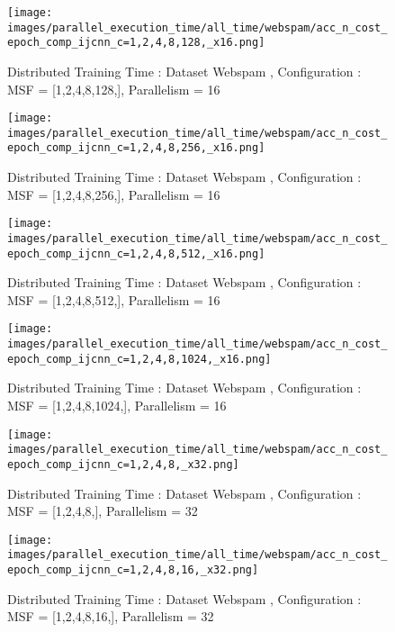\begin{figure*}[htbp]
\centering
\texttt{[image: images/parallel\_execution\_time/all\_time/webspam/acc\_n\_cost\_epoch\_comp\_ijcnn\_c=1,2,4,8,128,\_x16.png]}
\caption{Distributed Training Time : Dataset Webspam , Configuration : MSF = [1,2,4,8,128,], Parallelism = 16}
\label{fig:dis-msf-tr-time-webspam-x16}
\end{figure*}


\begin{figure*}[htbp]
\centering
\texttt{[image: images/parallel\_execution\_time/all\_time/webspam/acc\_n\_cost\_epoch\_comp\_ijcnn\_c=1,2,4,8,256,\_x16.png]}
\caption{Distributed Training Time : Dataset Webspam , Configuration : MSF = [1,2,4,8,256,], Parallelism = 16}
\label{fig:dis-msf-tr-time-webspam-x16}
\end{figure*}


\begin{figure*}[htbp]
\centering
\texttt{[image: images/parallel\_execution\_time/all\_time/webspam/acc\_n\_cost\_epoch\_comp\_ijcnn\_c=1,2,4,8,512,\_x16.png]}
\caption{Distributed Training Time : Dataset Webspam , Configuration : MSF = [1,2,4,8,512,], Parallelism = 16}
\label{fig:dis-msf-tr-time-webspam-x16}
\end{figure*}


\begin{figure*}[htbp]
\centering
\texttt{[image: images/parallel\_execution\_time/all\_time/webspam/acc\_n\_cost\_epoch\_comp\_ijcnn\_c=1,2,4,8,1024,\_x16.png]}
\caption{Distributed Training Time : Dataset Webspam , Configuration : MSF = [1,2,4,8,1024,], Parallelism = 16}
\label{fig:dis-msf-tr-time-webspam-x16}
\end{figure*}


\begin{figure*}[htbp]
\centering
\texttt{[image: images/parallel\_execution\_time/all\_time/webspam/acc\_n\_cost\_epoch\_comp\_ijcnn\_c=1,2,4,8,\_x32.png]}
\caption{Distributed Training Time : Dataset Webspam , Configuration : MSF = [1,2,4,8,], Parallelism = 32}
\label{fig:dis-msf-tr-time-webspam-x32}
\end{figure*}


\begin{figure*}[htbp]
\centering
\texttt{[image: images/parallel\_execution\_time/all\_time/webspam/acc\_n\_cost\_epoch\_comp\_ijcnn\_c=1,2,4,8,16,\_x32.png]}
\caption{Distributed Training Time : Dataset Webspam , Configuration : MSF = [1,2,4,8,16,], Parallelism = 32}
\label{fig:dis-msf-tr-time-webspam-x32}
\end{figure*}


